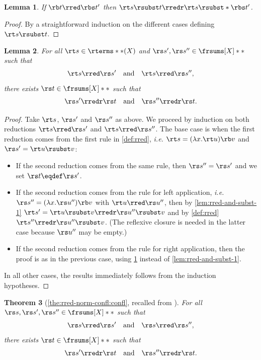 \documentclass[10pt,a4paper]{amsart}
\newtheorem{theorem}{Theorem}
\newtheorem{lemma}[theorem]{Lemma}
\theoremstyle{definition}
\begin{document}
\begin{lemma} \label{lem:rred-and-subst-2}
	If $\rb t \rred \rbs t'$ then 
	$\rt s \rsubst t \rredr \rt s \rsubst* {\rbs t'}$.
\end{lemma}
	
	\begin{proof}
	By a straightforward induction on the different cases
	defining $\rt s \rsubst t$.
	\end{proof}

\begin{lemma} \label{lem:rred-confl-one-term}
	For all $\rt s \in \rterms**(X)$ and 
	$\rs s', \rs s'' \in \frsums[X]**$ such that 
	\[ \rt s \rred \rs s' \quad \text{and} \quad \rt s \rred \rs s'', \]
	there exists $\rs t \in \frsums[X]**$ such that
	\[ \rs s' \rredr \rs t \quad \text{and} \quad \rs s'' \rredr \rs t. \]
\end{lemma}
	
	\begin{proof}
	Take $\rt s$, $\rs s'$ and $\rs s''$ as above.
	We proceed by induction on both reductions
	$\rt s \rred \rs s'$ and $\rt s \rred \rs s''$.
	The base case is when the first reduction
	comes from the first rule in \cref{def:rred},
	\emph{i.e.} $\rt s = (\ensuremath{\lambda}x.\rt u)\rb v$
	and $\rs s' = \rt u \rsubst v$:
	\begin{itemize}
	\item If the second reduction comes from the same rule,
		then $\rs s'' = \rs s'$ and we set $\rs t \eqdef \rs s'$.
	\item If the second reduction comes from the rule for left application,
		\emph{i.e.} $\rs s'' = (\ensuremath{\lambda}x.\rs u'')\rb v$
		with $\rt u \rred \rs u''$, then
		by \cref{lem:rred-and-subst-1}
		$\rt s' = \rt u \rsubst v \rredr \rs u'' \rsubst v$
		and by \cref{def:rred} $\rt s'' \rredr \rs u'' \rsubst v$.
		(The reflexive closure is needed in the latter case
		because $\rs u''$ may be empty.)
	\item If the second reduction comes from the rule for right application,
		then the proof is as in the previous case,
		using \cref{lem:rred-and-subst-2}
		instead of \cref{lem:rred-and-subst-1}.
	\end{itemize}
	In all other cases, the results immediately follows from
	the induction hypotheses.
	\end{proof}

\begin{theorem}[\cref{the:rred-norm-confl:confl},
recalled from ]
	For all $\rs s, \rs s', \rs s'' \in \frsums[X]**$ 	such that 
	\[ \rs s \rred \rs s' \quad \text{and} \quad \rs s \rred \rs s'', \]
	there exists $\rs t \in \frsums[X]**$ such that
	\[ \rs s' \rredr \rs t \quad \text{and} \quad \rs s'' \rredr \rs t. \]
\end{theorem}
\end{document}
